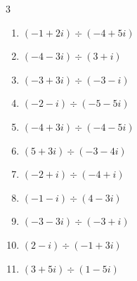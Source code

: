 \begin{multicols}{3}
\begin{enumerate}
        \phantom{$\displaystyle =1$}

  \item $\displaystyle (-1+2i)\div(-4+5i)$


  \item $\displaystyle (-4-3i)\div(3+i)$


  \item $\displaystyle (-3+3i)\div(-3-i)$


  \item $\displaystyle (-2-i)\div(-5-5i)$


  \item $\displaystyle (-4+3i)\div(-4-5i)$


  \item $\displaystyle (5+3i)\div(-3-4i)$


\columnbreak %

\resetques

  \item $\displaystyle (-2+i)\div(-4+i)$


  \item $\displaystyle (-1-i)\div(4-3i)$


  \item $\displaystyle (-3-3i)\div(-3+i)$


  \item $\displaystyle (2-i)\div(-1+3i)$


  \item $\displaystyle (3+5i)\div(1-5i)$



\end{enumerate}
\end{multicols}
